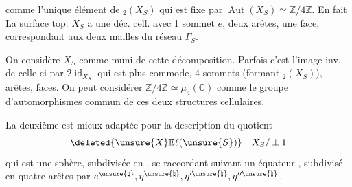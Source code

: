 
comme l'unique élément de \({}_2(X_S)\) qui est fixe par $\operatorname{Aut}(X_S)\simeq\mathbb Z/4\mathbb Z$. En fait
\inserted{\[
(X_S)^{\unsure{i}}\overset{\unsure{\mathrm{def}}}{\unsure{=}}\{x\in X_S\deleted{\}} \mid ix=x\}=\{e,\eta_S\}
\]}
 La surface top. $X_S$ a une déc. cell.   avec 1 sommet $e$, deux arêtes, une face, correspondant aux deux mailles du réseau $\Gamma_S$.

On considère $X_S$ comme muni de cette décomposition. Parfois c'est l'image inv. de celle-ci par $2\operatorname{id}_{X_S}$ qui est plus commode, 4 sommets (formant \({}_2(X_S)\)),   arêtes,   faces. On peut considérer $\mathbb Z/4\mathbb Z\simeq\mu_4(\mathbb C)$ comme le groupe d'automorphismes commun de ces deux structures cellulaires.


La deuxième est mieux adaptée pour la description du quotient
\[
\deleted{\unsure{X}\mathbb E\ell(\unsure{S})}\quad X_S/\pm1
\]
qui est une sphère, subdivisée en   , se raccordant suivant un équateur , subdivisé en quatre arêtes par $e^{\unsure{\natural}},\eta^{\unsure{\natural}},\eta'^{\unsure{\natural}},\eta''^{\unsure{\natural}}$.

